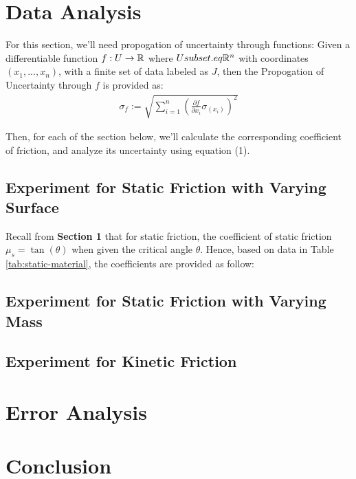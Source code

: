 \documentclass{article}
\begin{document}
\pagebreak

\section{Data Analysis}
For this section, we'll need propogation of uncertainty through functions: Given a differentiable function $f:U \rightarrow \mathbb{R}$ where $U subset.eq \mathbb{R}^n$ with coordinates $(x_1,...,x_n)$, with a finite set of data labeled as $J$, then the Propogation of Uncertainty through $f$ is provided as:
\begin{align}
    \sigma_f := \sqrt{\sum_{i=1}^n \left(\frac{\partial f}{\partial x_i}\sigma_(x_i)\right)^2}
\end{align}

Then, for each of the section below, we'll calculate the corresponding coefficient of friction, and analyze its uncertainty using equation (1).

\subsection{Experiment for Static Friction with Varying Surface}
Recall from \textbf{Section 1} that for static friction, the coefficient of static friction $\mu_s =\tan(\theta)$ when given the critical angle $\theta$. Hence, based on data in Table \ref{tab:static-material}, the coefficients are provided as follow:


\subsection{Experiment for Static Friction with Varying Mass}

\subsection{Experiment for Kinetic Friction}

\section{Error Analysis}

\section{Conclusion}

\newpage
\end{document}
